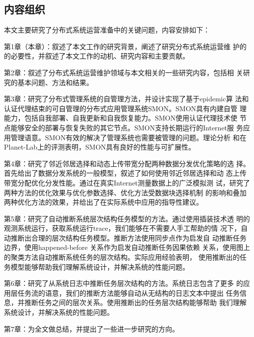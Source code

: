 \subsection{内容组织}

本文主要研究了分布式系统运营准备中的关键问题，内容安排如下：

  第1章（本章）：叙述了本文工作的研究背景，阐述了研究分布式系统运营维
  护的的必要性，并叙述了本文工作的动机、研究内容和主要贡献。

  第2章：叙述了分布式系统运营维护领域与本文相关的一些研究内容，包括相
  关研究的基本问题、方法和结果。

  第3章：研究了分布式管理系统的自管理方法，并设计实现了基于epidemic算
  法和认证代理结束的可自管理的分布式应用管理系统SMON。SMON具有内建自管
  理能力，包括自我部署、自我更新和自我恢复能力。SMON使用认证代理技术使
  节点能够安全的部署与恢复失败的其它节点。SMON支持长期运行的Internet服
  务应用管理语意。SMON有效的解决了管理系统也需要被管理的问题。理论分析
  和在Planet-Lab上的评测表明，SMON具有良好的性能与可扩展性。

  第4章：研究了邻近邻居选择和动态上传带宽分配两种数据分发优化策略的选
  择。首先给出了数据分发系统的一般模型，叙述了如何使用邻近邻居选择和动
  态上传带宽分配优化分发性能。通过在真实Internet测量数据上的广泛模拟测
  试，研究了两种方法的优化效果与优化参数选择、优化方法受数据块选择机制
  的影响和叠加两种优化方法的效果，并给出了在实际系统中应用的指导性建议。

  第5章：研究了自动推断系统层次结构任务模型的方法。通过使用插装技术透
  明的观测系统运行，获取系统运行trace，我们能够在不需要人手工帮助的情
  况下，自动推断出合理的层次结构任务模型。推断方法使用同步点作为启发自
  动推断任务边界，使用happened-before 关系作为启发自动推断任务因果依赖
  关系，使用图上的聚类方法自动推断系统任务的层次结构。实际应用经验表明，
  使用推断出的任务模型能够帮助我们理解系统设计，并解决系统的性能问题。

  第6章：研究了从系统日志中推断任务层次结构的方法。系统日志包含了更多
  的应用层任务流的语意，我们的推断方法能够自动从无结构的日志文本中提出
  任务信息，并推断任务之间的层次关系。使用推断出的任务层次结构能够帮助
  我们理解系统设计，并解决系统的性能问题。

  第7章：为全文做总结，并提出了一些进一步研究的方向。
